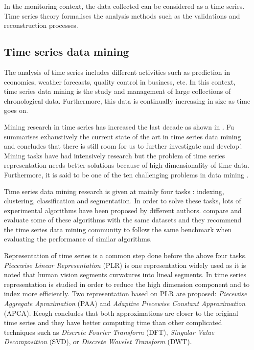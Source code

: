 
In the monitoring context, the data collected can be considered as a time
series.  Time series theory formalises the analysis methods such as the validations and reconstruction processes.



\subsection{Time series data mining}

The analysis of time series includes different activities such as prediction in economics, weather forecasts, quality control in business, etc. In this context, time series data mining is the study and management of large collections of chronological data. Furthermore, this data is continually increasing in size as time goes on.

Mining research in time series has increased the last decade as shown in \textcite{fu11}. Fu summarises exhaustively the current state of the art in time series data mining  and concludes that there is still room for us to further investigate and develop'. Mining tasks have had intensively research but the problem of  time series representation needs better solutions because of high dimensionality of time data. Furthermore, it is said to be one of the ten challenging problems in data mining \parencite{yangwu06}.
 
Time series data mining research  is given at mainly four tasks \parencite{keogh02}: indexing, clustering, classification and segmentation. In order to solve these tasks, lots of experimental algorithms have been proposed by different authors. \textcite{keogh02} compare and evaluate some of these algorithms with the same datasets and they recommend the time series data mining community to follow the same benchmark when evaluating the performance of similar algorithms. 

Representation of time series is a common step done before the above four tasks.
\emph{Piecewise Linear Representation} (PLR) \parencite{keogh97,keogh98}  is one representation widely used as it is noted that human vision segments curvatures into lineal segments. In \textcite{keogh00,keogh01} time series representation is studied in order to reduce the high dimension component and to index more efficiently. Two representation based on PLR are proposed: \emph{Piecewise Aggregate Aproximation} (PAA) and \emph{Adaptive Piecewise Constant Approximation} (APCA). Keogh concludes that both approximations are closer to the original time series and they have better computing time than other complicated techniques such as \emph{Discrete Fourier Transform} (DFT), \emph{Singular Value Decomposition} (SVD), or \emph{Discrete Wavelet Transform} (DWT).



